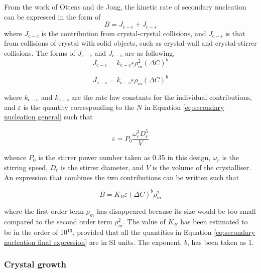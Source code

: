 From the work of Ottens and de Jong, \cite{Ottens} the kinetic rate of secondary nucleation can be expressed in the form of 
\begin{equation}
    B = J_{\mathrm{c-c}} + J_{\mathrm{c-s}}
\end{equation}
 where $J_{\mathrm{c-c}}$ is the contribution from crystal-crystal collisions, and $J_{\mathrm{c-s}}$ is that from collisions of crystal with solid objects, such as crystal-wall and crystal-stirrer collisions. The forms of $J_{\mathrm{c-c}}$ and $J_{\mathrm{c-s}}$ are as following,
\begin{equation}
    J_{\mathrm{c-c}} = k_{\mathrm{c-c}} \varepsilon \rho_m^2 (\Delta C)^b
\end{equation}

\begin{equation}
    J_{\mathrm{c-s}} = k_{\mathrm{c-s}} \varepsilon \rho_m (\Delta C)^b
\end{equation}

\noindent where $k_{\mathrm{c-c}}$ and $k_{\mathrm{c-s}}$ are the rate law constants for the individual contributions, and $\varepsilon$ is the quantity corresponding to the $N$ in Equation \ref{eq:secondary nucleation general} such that 

\begin{equation}
    \varepsilon = P_0 \frac{\omega_r^3 D_r^5}{V} 
\end{equation}

\noindent whence $P_0$ is the stirrer power number taken as 0.35 in this design, $\omega_r$ is the stirring speed, $D_r$ is the stirrer diameter, and $V$ is the volume of the crystalliser. An expression that combines the two contributions can be written such that 

\begin{equation} \label{eq:secondary nucleation final expression}
    B = K_B \varepsilon (\Delta C)^b \rho_m^2
\end{equation}

\noindent where the first order term $\rho_m$ has disappeared because its size would be too small compared to the second order term $\rho_m^2$. The value of $K_B$ has been estimated to be in the order of 10$^{13}$, \cite{Bauer} provided that all the quantities in Equation \ref{eq:secondary nucleation final expression} are in SI units. The exponent, $b$, has been taken as 1. 

\subsubsection{Crystal growth} \label{sec: crystal growth}

